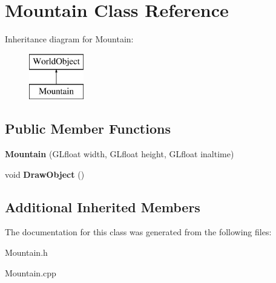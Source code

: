 \hypertarget{class_mountain}{\section{Mountain Class Reference}
\label{class_mountain}
}
Inheritance diagram for Mountain\+:\begin{figure}[H]
\begin{center}
\leavevmode
\includegraphics[height=2.000000cm]{class_mountain}
\end{center}
\end{figure}
\subsection*{Public Member Functions}
\begin{DoxyCompactItemize}
\item 
\hypertarget{class_mountain_a32ddb9ae59bd166cf3059fddef8061cd}{{\bfseries Mountain} (G\+Lfloat width, G\+Lfloat height, G\+Lfloat inaltime)}\label{class_mountain_a32ddb9ae59bd166cf3059fddef8061cd}

\item 
\hypertarget{class_mountain_a146cf4314092e1c6cbfa957724476af0}{void {\bfseries Draw\+Object} ()}\label{class_mountain_a146cf4314092e1c6cbfa957724476af0}

\end{DoxyCompactItemize}
\subsection*{Additional Inherited Members}


The documentation for this class was generated from the following files\+:\begin{DoxyCompactItemize}
\item 
Mountain.\+h\item 
Mountain.\+cpp\end{DoxyCompactItemize}
